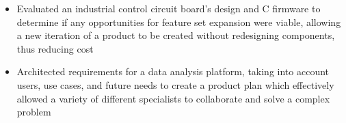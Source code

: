 \documentclass[10pt]{article}
\begin{document}
\begin{flushleft}
\begin{itemize}
		\item Evaluated an industrial control circuit board's design and C firmware to determine if any opportunities for feature set expansion were viable, allowing a new iteration of a product to be created without redesigning components, thus reducing cost

		\item Architected requirements for a data analysis platform, taking into account users, use cases, and future needs to create a product plan which effectively allowed a variety of different specialists to collaborate and solve a complex problem
    \end{itemize}






\end{flushleft}
\end{document}
